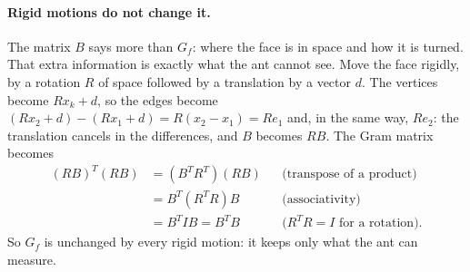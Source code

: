 \paragraph{Rigid motions do not change it.} The matrix $B$ says more than $G_f$: where the face is in space and how it is turned. That extra information is exactly what the ant cannot see. Move the face rigidly, by a rotation $R$ of space followed by a translation by a vector $d$. The vertices become $Rx_k + d$, so the edges become $(Rx_2 + d) - (Rx_1 + d) = R(x_2 - x_1) = Re_1$ and, in the same way, $Re_2$: the translation cancels in the differences, and $B$ becomes $RB$. The Gram matrix becomes
\begin{align*}
(RB)^T(RB) &= (B^T R^T)(R B) && \text{(transpose of a product)} \\
&= B^T (R^T R) B && \text{(associativity)} \\
&= B^T I B = B^TB && \text{($R^TR = I$ for a rotation).}
\end{align*}
So $G_f$ is unchanged by every rigid motion: it keeps only what the ant can measure.

